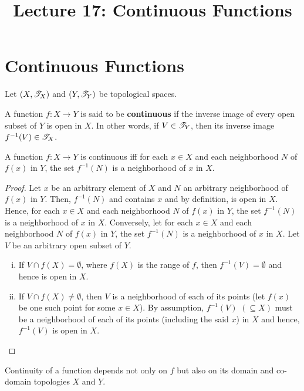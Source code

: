 \documentclass[a4paper,english,12pt]{article}
\title{Lecture 17: Continuous Functions}
\author{}
\begin{document}
\maketitle

\section{Continuous Functions}
Let $(X,\mathscr{T}_X)$ and $(Y,\mathscr{T}_Y)$ be topological spaces. 
\begin{defn} A function $f:X\to Y$ is said to be \textbf{continuous} if the inverse image of every open subset of $Y$ is open in $X$. In other words, if $V\in \mathscr{T}_Y$, then  its inverse image $f^{-1}(V)\in \mathscr{T}_X$.
\end{defn}

\begin{prop}
A function $f:X\to Y$ is continuous iff for each $x \in X$ and each neighborhood $N$ of $f(x)$ in $Y$, the set $f^{-1}(N)$ is a neighborhood of $x$ in $X$.
\end{prop}
\begin{proof}
Let $x$ be an arbitrary element of $X$ and $N$ an arbitrary neighborhood of $f(x)$ in $Y$. Then, $f^{-1}(N)$ and contains $x$ and by definition, is open in $X$. Hence, for each $x \in X$ and each neighborhood $N$ of $f(x)$ in $Y$, the set $f^{-1}(N)$ is a neighborhood of $x$ in $X$.
Conversely, let for each $x \in X$ and each neighborhood $N$ of $f(x)$ in $Y$, the set $f^{-1}(N)$ is a neighborhood of $x$ in $X$. Let $V$ be an arbitrary open subset of $Y$. 
\begin{enumerate}[i)]
\item If $V\cap f(X)=\emptyset$, where $f(X)$ is the range of $f$, then $f^{-1}(V)=\emptyset$ and hence is open in $X$.
\item If $V\cap f(X)\neq \emptyset$, then $V$ is a neighborhood of each of its points (let $f(x)$ be one such point for some $x\in X$). By assumption, $f^{-1}(V)$ $(\subseteq X)$ must be a neighborhood of each of its points (including the said $x$) in $X$ and hence, $f^{-1}(V)$ is open in $X$.
\end{enumerate}
\end{proof}

\begin{note} Continuity of a function depends not only on $f$ but also on its domain and co-domain topologies $X$ and $Y$.
\end{note}
\end{document}
